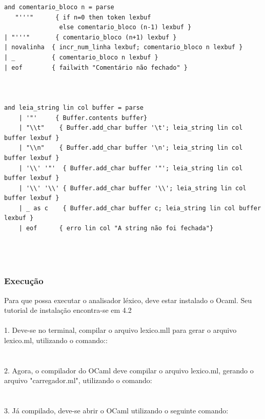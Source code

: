 \documentclass{article}
\begin{document}
\begin{lstlisting}
and comentario_bloco n = parse
   "'''"      { if n=0 then token lexbuf 
               else comentario_bloco (n-1) lexbuf }
| "'''"       { comentario_bloco (n+1) lexbuf }
| novalinha  { incr_num_linha lexbuf; comentario_bloco n lexbuf }
| _          { comentario_bloco n lexbuf }
| eof        { failwith "Comentário não fechado" }



and leia_string lin col buffer = parse
    | '"'     { Buffer.contents buffer}
    | "\\t"    { Buffer.add_char buffer '\t'; leia_string lin col buffer lexbuf }
    | "\\n"    { Buffer.add_char buffer '\n'; leia_string lin col buffer lexbuf }
    | '\\' '"'  { Buffer.add_char buffer '"'; leia_string lin col buffer lexbuf }
    | '\\' '\\' { Buffer.add_char buffer '\\'; leia_string lin col buffer lexbuf }
    | _ as c    { Buffer.add_char buffer c; leia_string lin col buffer lexbuf }
    | eof      { erro lin col "A string não foi fechada"}




\end{lstlisting}



\subsubsection{Execução}
Para que possa executar o analisador léxico, deve estar instalado o Ocaml. Seu tutorial
de instalação encontra-se em 4.2\\\\

1. Deve-se no terminal, compilar o arquivo lexico.mll para gerar o arquivo lexico.ml, utilizando o comando::\\
\\\\

2. Agora, o compilador do OCaml deve compilar o arquivo lexico.ml, gerando o arquivo
"carregador.ml", utilizando o comando:\\
\\\\

3. Já compilado, deve-se abrir o OCaml utilizando o seguinte comando:\\
\\\\
\end{document}
